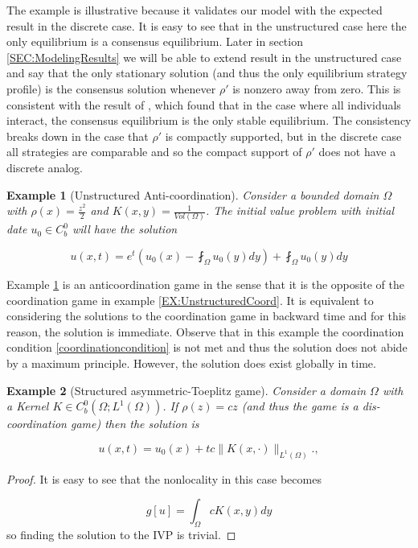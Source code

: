 \documentclass[aps,
preprint,
groupedaddress,
showkeys,
amsmath]{revtex4-2}
\newtheorem{example}{Example}
\begin{document}
    The example is illustrative because it validates our model with the expected result in the discrete case. It is easy to see that in the unstructured case here the only equilibrium is a consensus equilibrium. Later in section \ref{SEC:ModelingResults} we will be able to extend result in the unstructured case and say that the only stationary solution (and thus the only equilibrium strategy profile) is the consensus solution whenever $\rho'$ is nonzero away from zero. This is consistent with the result of \cite{Kandori1993}, which found that in the case where all individuals interact, the consensus equilibrium is the only stable equilibrium. The consistency breaks down in the case that $\rho'$ is compactly supported, but in the discrete case all strategies are comparable and so the compact support of $\rho'$ does not have a discrete analog.

    \begin{example}[Unstructured Anti-coordination]\label{EX:UnstructuredAnticoord}
        Consider a  bounded domain $\Omega$ with $\rho(x)=\frac{z^2}{2}$ and $K(x,y)=\frac{1}{Vol(\Omega)}$. The initial value problem with initial date $u_0\in C^0_b$ will have the solution
        
       \[u(x,t)=e^{t}\left( u_0(x)-\fint_\Omega u_0(y)dy\right)+\fint_\Omega u_0(y)dy\]
        
    \end{example}
    Example \ref{EX:UnstructuredAnticoord} is an anticoordination game in the sense that it is the opposite of the coordination game in example \ref{EX:UnstructuredCoord}. It is equivalent to considering the solutions to the coordination game in backward time and for this reason, the solution is immediate. Observe that in this example the coordination condition \eqref{coordinationcondition} is not met and thus the solution does not abide by a maximum principle. However, the solution does exist globally in time.

    \begin{example}[Structured asymmetric-Toeplitz game]\label{EX:Asymmetric}
    Consider a domain $\Omega$ with a Kernel $K\in C^0_b(\Omega;L^1(\Omega))$. If $\rho(z)=cz$ (and thus the game is a dis-coordination game) then the solution is
    
   \[u(x,t)=u_0(x)+tc\|K(x,\cdot)\|_{L^1(\Omega)}.,\]
    \end{example}
    \begin{proof}
        It is easy to see that the nonlocality in this case becomes
        
       \[g[u]=\int_\Omega cK(x,y)dy\] so finding the solution to the IVP is trivial. 
    \end{proof}
\end{document}
